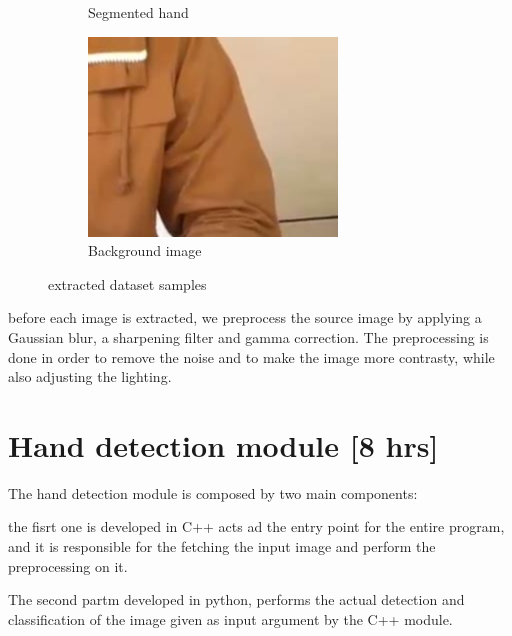 \begin{figure}
\begin{subfigure}[b]{0.3\textwidth}
        \caption{Segmented hand}
        \label{fig:three sin x}
    \end{subfigure}
    \hfill
    \begin{subfigure}[b]{0.3\textwidth}
        \centering
        \includegraphics[width=\textwidth]{images/notHand/133.jpg}
        \caption{Background image}
        \label{fig:five over x}
    \end{subfigure}
    \caption{extracted dataset samples}
    \label{fig:three graphs}
\end{figure}

before each image is extracted, we preprocess the source image by applying a
Gaussian blur, a sharpening filter and gamma correction. The preprocessing is
done in order to remove
the noise and to make the image more contrasty, while also adjusting the
lighting.

\section{Hand detection module [8 hrs]}
The hand detection module is composed by two main components:

the fisrt one is developed in C++ acts ad the entry point for the entire
program, and it is responsible for the
fetching the input image and perform the preprocessing on it.

The second partm developed in python, performs the actual detection and
classification of the image given as input argument
by the C++ module.

